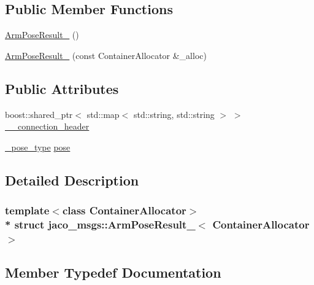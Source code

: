 \subsection*{Public Member Functions}
\begin{DoxyCompactItemize}
\item 
\hyperlink{structjaco__msgs_1_1ArmPoseResult___a7e3c6b8dc1059e2ed15d87a17cc38b7a}{Arm\+Pose\+Result\+\_\+} ()
\item 
\hyperlink{structjaco__msgs_1_1ArmPoseResult___adf9bd1d03fd5dbc6155bf97b7d3fd6d2}{Arm\+Pose\+Result\+\_\+} (const Container\+Allocator \&\+\_\+alloc)
\end{DoxyCompactItemize}
\subsection*{Public Attributes}
\begin{DoxyCompactItemize}
\item 
boost\+::shared\+\_\+ptr$<$ std\+::map$<$ std\+::string, std\+::string $>$ $>$ \hyperlink{structjaco__msgs_1_1ArmPoseResult___aa08c58d11ec3fbf9a5063c6d68f55c0b}{\+\_\+\+\_\+connection\+\_\+header}
\item 
\hyperlink{structjaco__msgs_1_1ArmPoseResult___a498b066ab7353819251e9a9ca39142bb}{\+\_\+pose\+\_\+type} \hyperlink{structjaco__msgs_1_1ArmPoseResult___a35fabbce17a2d3c3c0e9bcd97985053b}{pose}
\end{DoxyCompactItemize}


\subsection{Detailed Description}
\subsubsection*{template$<$class Container\+Allocator$>$\\*
struct jaco\+\_\+msgs\+::\+Arm\+Pose\+Result\+\_\+$<$ Container\+Allocator $>$}



\subsection{Member Typedef Documentation}
